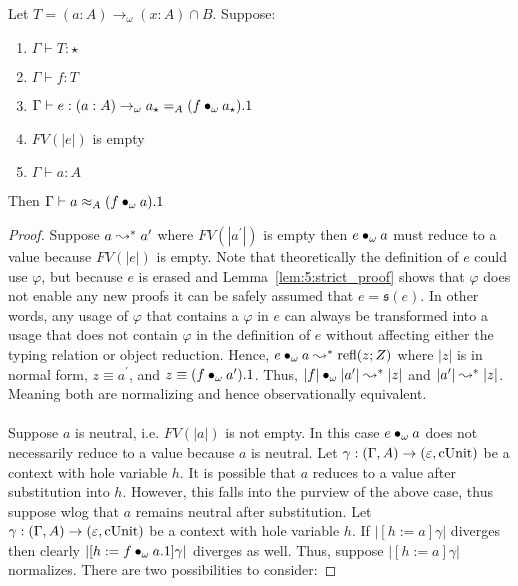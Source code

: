 \begin{lemma}
    \label{lem:5:phi_obs_id}
    Let $T = (a : A) \to_\omega (x : A) \cap B$.
    Suppose:
    \begin{enumerate}
        \item $\Gamma \vdash T : \star$
        \item $\Gamma \vdash f : T$
        \item $\Gamma \vdash e : (a : A) \to_\omega a_\star =_A (f \bullet_{\omega} a_\star).1$
        \item $FV(|e|)$ is empty
        \item $\Gamma \vdash a : A$
    \end{enumerate}
    Then $\Gamma \vdash a \approx_A (f \bullet_{\omega} a).1$
\end{lemma}
\begin{proof}
    Suppose $a \leadsto^* a^\prime$ where $FV(|a^\prime|)$ is empty then $e \bullet_{\omega} a$ must reduce to a value because $FV(|e|)$ is empty.
    Note that theoretically the definition of $e$ could use $\varphi$, but because $e$ is erased and Lemma~\ref{lem:5:strict_proof} shows that $\varphi$ does not enable any new proofs it can be safely assumed that $e = \mathfrak{s}(e)$.
    In other words, any usage of $\varphi$ that contains a $\varphi$ in $e$ can always be transformed into a usage that does not contain $\varphi$ in the definition of $e$ without affecting either the typing relation or object reduction.
    Hence, $e \bullet_{\omega} a \leadsto^* \textnormal{refl}(z; Z)$ where $|z|$ is in normal form, $z \equiv a^\prime$, and $z \equiv (f \bullet_{\omega} a^\prime).1$.
    Thus, $|f| \bullet_{\omega} |a^\prime| \leadsto^* |z|$ and $|a^\prime| \leadsto^* |z|$.
    Meaning both are normalizing and hence observationally equivalent.
    \\ \\
    Suppose $a$ is neutral, i.e. $FV(|a|)$ is not empty.
    In this case $e \bullet_{\omega} a$ does not necessarily reduce to a value because $a$ is neutral.
    Let $\gamma : (\Gamma, A) \to (\varepsilon, \textnormal{cUnit})$ be a context with hole variable $h$.
    It is possible that $a$ reduces to a value after substitution into $h$.
    However, this falls into the purview of the above case, thus suppose wlog that $a$ remains neutral after substitution.
    Let $\gamma : (\Gamma, A) \to (\varepsilon, \textnormal{cUnit})$ be a context with hole variable $h$.
    If $|[h := a]\gamma|$ diverges then clearly $|[h := f \bullet_{\omega} a.1]\gamma|$ diverges as well.
    Thus, suppose $|[h := a]\gamma|$ normalizes.
    There are two possibilities to consider:

\end{proof}
